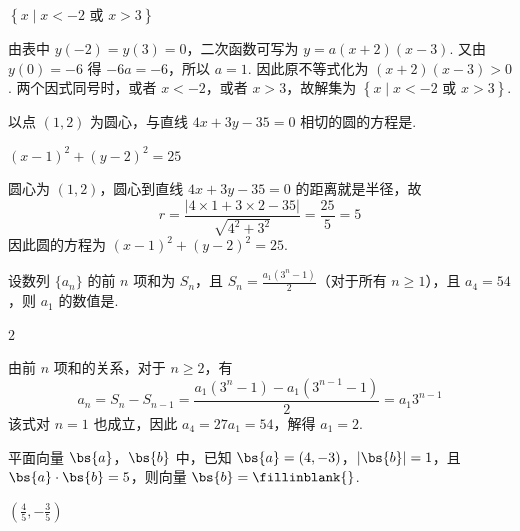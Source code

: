 \begin{answer}
\(\left\{x \mid x < -2 \text{ 或 } x > 3\right\}\)
\end{answer}

\begin{solution}
由表中 \(y(-2)=y(3)=0\)，二次函数可写为 \(y=a(x+2)(x-3)\). 又由 \(y(0)=-6\) 得 \(-6a=-6\)，所以 \(a=1\). 因此原不等式化为 \((x+2)(x-3)>0\). 两个因式同号时，或者 \(x<-2\)，或者 \(x>3\)，故解集为 \(\left\{x\mid x<-2\text{ 或 }x>3\right\}\).
\end{solution}

\begin{problem}
以点 \((1,2)\) 为圆心，与直线 \(4x+3y-35=0\) 相切的圆的方程是\fillinblank{}.
\end{problem}

\begin{answer}
\((x-1)^2+(y-2)^2=25\)
\end{answer}

\begin{solution}
圆心为 \((1,2)\)，圆心到直线 \(4x+3y-35=0\) 的距离就是半径，故
\[
r=\frac{|4\times1+3\times2-35|}{\sqrt{4^2+3^2}}=\frac{25}{5}=5
\]
因此圆的方程为 \((x-1)^2+(y-2)^2=25\).
\end{solution}

\begin{problem}
设数列 \(\{a_{n}\}\) 的前 \(n\) 项和为 \(S_{n}\)，且 \(S_{n} = \frac{a_{1}(3^{n} - 1)}{2}\)（对于所有 \(n \geqslant 1\)），且 \(a_{4} = 54\)，则 \(a_{1}\) 的数值是\fillinblank{}.
\end{problem}

\begin{answer}
\(2\)
\end{answer}

\begin{solution}
由前 \(n\) 项和的关系，对于 \(n\geqslant2\)，有
\[
a_n=S_n-S_{n-1}=\frac{a_1(3^n-1)-a_1(3^{n-1}-1)}2=a_1 3^{n-1}
\]
该式对 \(n=1\) 也成立，因此 \(a_4=27a_1=54\)，解得 \(a_1=2\).
\end{solution}

\begin{problem}
平面向量 \(\bs{a}\)，\(\bs{b}\) 中，已知 \(\bs{a} = (4, -3)\)，\(\left|\bs{b}\right| = 1\)，且 \(\bs{a} \cdot \bs{b} = 5\)，则向量 \(\bs{b} =\fillinblank{}\).
\end{problem}

\begin{answer}
\(\left(\frac{4}{5}, -\frac{3}{5}\right)\)
\end{answer}

